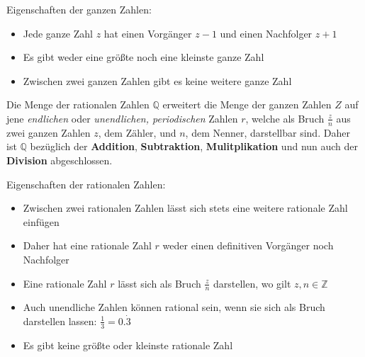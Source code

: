 Eigenschaften der ganzen Zahlen:

\begin{itemize}
	\item Jede ganze Zahl $z$ hat einen Vorg\"{a}nger $z - 1$ und einen Nachfolger $z + 1$
	\item Es gibt weder eine gr\"{o}\ss{}te noch eine kleinste ganze Zahl
	\item Zwischen zwei ganzen Zahlen gibt es keine weitere ganze Zahl
\end{itemize}

\pagebreak


Die Menge der rationalen Zahlen $\mathbb{Q}$ erweitert die Menge der ganzen Zahlen $Z$ auf jene \emph{endlichen} oder \emph{unendlichen, periodischen} Zahlen $r$, welche als Bruch $\frac{z}{n}$ aus zwei ganzen Zahlen $z$, dem Z\"{a}hler, und $n$, dem Nenner, darstellbar sind. Daher ist $\mathbb{Q}$ bez\"{u}glich der \textbf{Addition}, \textbf{Subtraktion}, \textbf{Mulitplikation} und nun auch der \textbf{Division} abgeschlossen. 

\begin{figure}[h!]
\end{figure}
Eigenschaften der rationalen Zahlen:
\begin{itemize}
	\item Zwischen zwei rationalen Zahlen l\"{a}sst sich stets eine weitere rationale Zahl einf\"{u}gen
	\item Daher hat eine rationale Zahl $r$ weder einen definitiven Vorg\"{a}nger noch Nachfolger
	\item Eine rationale Zahl $r$ l\"{a}sst sich als Bruch $\frac{z}{n}$ darstellen, wo gilt $z, n \in \mathbb{Z}$
	\item Auch unendliche Zahlen k\"{o}nnen rational sein, wenn sie sich als Bruch darstellen lassen: $\frac{1}{3} = 0.\dot{3}$
	\item Es gibt keine gr\"{o}\ss{}te oder kleinste rationale Zahl
\end{itemize}

